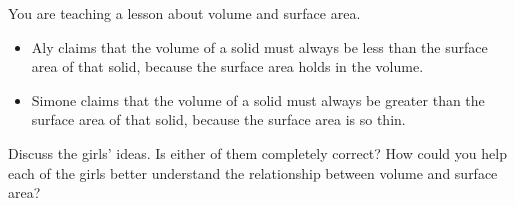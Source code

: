 \documentclass{ximera}
\begin{document}
\newpage
\begin{problem}
You are teaching a lesson about volume and surface area.
    \begin{itemize}
        \item Aly claims that the volume of a solid must always be less than the surface area of that solid, because the surface area holds in the volume.
        \item Simone claims that the volume of a solid must always be greater than the surface area of that solid, because the surface area is so thin.
    \end{itemize}
    Discuss the girls' ideas.  Is either of them completely correct?  How could you help each of the girls better understand the relationship between volume and surface area?
\end{problem}
\end{document}
